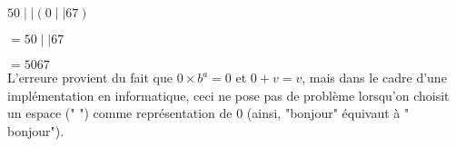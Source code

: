 \documentclass[a4paper, 12pt]{article}
\begin{document}
\hspace{\parindent} $50 \mid\mid \left( 0 \mid\mid 67 \right)$

\hspace{\parindent} $= 50 \mid\mid 67$

\hspace{\parindent} $= 5067$ \\

L'erreure provient du fait que $0 \times b^{a} = 0$ et $0 + v = v$, mais dans le cadre
d'une implémentation en informatique, ceci ne pose pas de problème lorsqu'on choisit
un espace (" ") comme représentation de 0 (ainsi, "bonjour" équivaut à "    bonjour").
\end{document}
